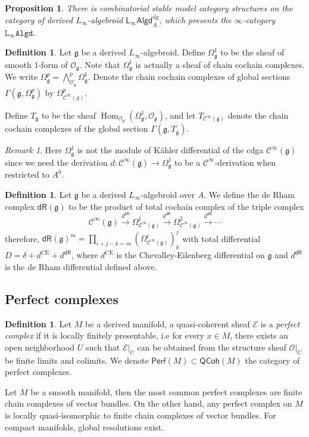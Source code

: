 \documentclass[12pt]{amsart}
\newtheorem{prop}[thm]{Proposition}
\theoremstyle{definition}
\newtheorem{defn}[thm]{Definition}
\theoremstyle{remark}
\newtheorem{rem}[thm]{Remark}
\numberwithin{equation}{section}
\newcommand{\CO}{{\mathcal O}}
\newcommand{\cinf}{{\mathcal C}^{\infty}}
\newcommand{\1}{{\mathbb{1}}}
\newcommand{\E}{{\mathcal{E}}}
\newcommand{\g}{\mathfrak{g}}
\newcommand{\CE}{\operatorname{CE}}
\newcommand{\perf}{\mathsf{Perf}}
\newcommand{\dr}{\mathsf{dR}}
\newcommand{\QCoh}{\mathsf{QCoh}}
\newcommand{\lalgd}{\mathsf{L_{\infty}Algd}^{\operatorname{dg}}}
\newcommand{\lalgdi}{\mathtt{L_{\infty}Algd}}
\newcommand{\Hom}{\operatorname{Hom}}
\begin{document}
\begin{prop}
There is combinatorial stable model category structures on the category of derived $L_{\infty}$-algebroid $\lalgd_A$, which presents the $\infty$-category $\lalgdi$.
\end{prop}



\begin{defn}
   Let $\g$ be a derived $L_{\infty}$-algebroid. Define $\Omega^1_{\g}$ to be the sheaf of smooth 1-form of $\CO_{\g}$. Note that $\Omega^1_{\g}$ is actually a sheaf of chain cochain complexes. We write $\Omega^p_{\g} = \bigwedge^p_{\CO_{\g}}\Omega^1_{\g}$. Denote the chain cochain complexes of global sections $\Gamma(\g, \Omega^p_{\g})$ by $\Omega^p_{\cinf(g)}$.
   
    Define  $T_{\g}$ to be the sheaf $\Hom_{\CO_{\g}}(\Omega^1_{\g}, \CO_{\g})$, and let $T_{\cinf(\g)}$ denote the chain cochain complexes of the global section $\Gamma(\g, T_{\g})$.
\end{defn}

\begin{rem}
    Here $\Omega^1_{\g}$ is not the module of K\"{a}hler differential of the cdga $\cinf(\g)$ since we need the derivation $d: \cinf(\g) \to \Omega^1_{\g}$ to be a $\cinf$-derivation when restricted to $A^0$.
\end{rem}

\begin{defn}
Let $\g$ be a derived $L_{\infty}$-algebroid over $A$. We define the de Rham complex $\dr(\g)$ to be the product of total cochain complex of the triple complex
$$
    \cinf(\g) \stackrel{d^{\dr}}{\to} \Omega^1_{\cinf(\g)}  \stackrel{d^{\dr}}{\to} \Omega^2_{\cinf(\g)}  \stackrel{d^{\dr}}{\to} \cdots
$$
therefore, $\dr(\g)^m = \prod_{i + j - k = m} (\Omega^i_{\cinf(\g)})^j_k$ with total differential $D = \delta + d^{\CE} + d^{\dr}$, where $d^{\CE}$ is the Chevalley-Eilenberg differential on $\g$ and $d^{\dr}$ is the de Rham differential defined above.

\end{defn}
\subsection{Perfect complexes}

\begin{defn}
    Let $M$ be a derived manifold, a quasi-coherent sheaf $\E$ is a {\it perfect complex} if it is locally finitely presentable, i.e for every $x\in M$, there exists an open neighborhood $U$ such that $\E|_U$ can be obtained from the structure sheaf $\CO|_U$ be finite limits and colimits. We denote $\perf(M) \subset \QCoh(M)$ the category of perfect complexes.
\end{defn}
Let $M$ be a smooth manifold, then the most common perfect complexes are finite chain complexes of vector bundles. On the other hand, any perfect complex on $M$ is locally quasi-isomorphic to finite chain complexes of vector bundles. For compact manifolds, global resolutions exist.
\end{document}
